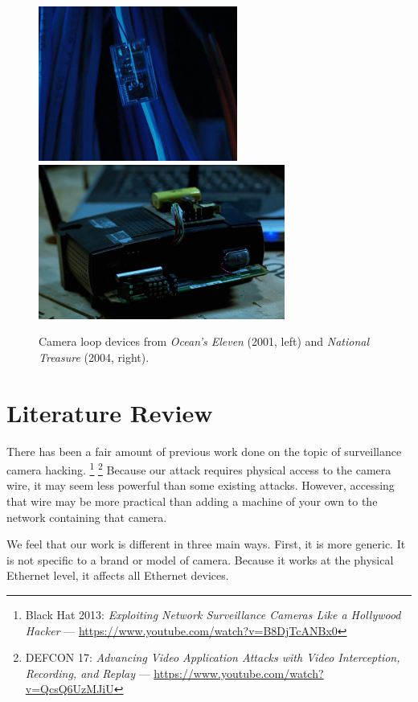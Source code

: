 \documentclass[12pt,notitlepage]{article}
\begin{document}
\begin{figure}[h!]
    \centering
    \includegraphics[height=2in]{oceanseleven}
    \includegraphics[height=2in]{nationaltreasure}
    \caption{Camera loop devices from \textit{Ocean’s Eleven} (2001, left) and \textit{National Treasure} (2004, right).}
\end{figure}

\section{Literature Review}

There has been a fair amount of previous work done on the topic of surveillance camera hacking.%
\footnote{Black Hat 2013: \textit{Exploiting Network Surveillance Cameras Like a Hollywood Hacker} --- \url{https://www.youtube.com/watch?v=B8DjTcANBx0}}%
\footnote{DEFCON 17: \textit{Advancing Video Application Attacks with Video Interception, Recording, and Replay} --- \url{https://www.youtube.com/watch?v=QcsQ6UzMJiU}}
Because our attack requires physical access to the camera wire, it may seem less powerful than some existing attacks. However, accessing that wire may be more practical than adding a machine of your own to the network containing that camera.

We feel that our work is different in three main ways. First, it is more generic. It is not specific to a brand or model of camera. Because it works at the physical Ethernet level, it affects all Ethernet devices.
\end{document}
